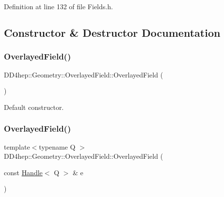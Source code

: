 Definition at line 132 of file Fields.\+h.



\subsection{Constructor \& Destructor Documentation}
\hypertarget{class_d_d4hep_1_1_geometry_1_1_overlayed_field_ac504446d6cfd14252ba0f4233c38c46f}{}\label{class_d_d4hep_1_1_geometry_1_1_overlayed_field_ac504446d6cfd14252ba0f4233c38c46f} 
\subsubsection{\texorpdfstring{Overlayed\+Field()}{OverlayedField()}\hspace{0.1cm}{\footnotesize\ttfamily [1/3]}}
{\footnotesize\ttfamily D\+D4hep\+::\+Geometry\+::\+Overlayed\+Field\+::\+Overlayed\+Field (\begin{DoxyParamCaption}{ }\end{DoxyParamCaption})\hspace{0.3cm}{\ttfamily [default]}}



Default constructor. 

\hypertarget{class_d_d4hep_1_1_geometry_1_1_overlayed_field_a388754137517f60f776a090f1de13652}{}\label{class_d_d4hep_1_1_geometry_1_1_overlayed_field_a388754137517f60f776a090f1de13652} 
\subsubsection{\texorpdfstring{Overlayed\+Field()}{OverlayedField()}\hspace{0.1cm}{\footnotesize\ttfamily [2/3]}}
{\footnotesize\ttfamily template$<$typename Q $>$ \\
D\+D4hep\+::\+Geometry\+::\+Overlayed\+Field\+::\+Overlayed\+Field (\begin{DoxyParamCaption}\item[{const \hyperlink{class_d_d4hep_1_1_handle}{Handle}$<$ Q $>$ \&}]{e }\end{DoxyParamCaption})\hspace{0.3cm}{\ttfamily [inline]}}



